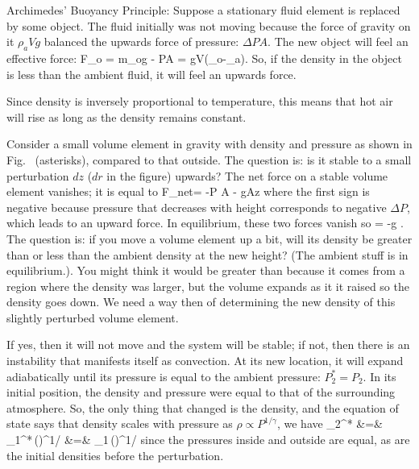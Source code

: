 \documentclass[11pt]{book}
\begin{document}
\bei
\item Archimedes' Buoyancy Principle: Suppose a stationary fluid element is replaced by some object. The fluid initially was not moving because the force of gravity on it $\rho_aVg$ balanced the upwards force of pressure: $\Delta P A$. The new object will feel an effective force:
\be
F_{\rm o} = m_og - \Delta PA = gV\left(\rho_o-\rho_a\right).\ee
So, if the density in the object is less than the ambient fluid, it will feel an upwards force. 
\item Since density is inversely proportional to temperature, this means that hot air will rise as long as the density remains constant.
\item 
Consider a small volume element in gravity with density and pressure as shown in Fig.~ (asterisks), compared to that outside. The question is: is it stable to a small perturbation $dz$ ($dr$ in the figure) upwards? The net force on a stable volume element vanishes; it is equal to 
\be
\Delta F_{net}= -\Delta P A - g\rho A\Delta z
\ee
where the first sign is negative because pressure that decreases with height corresponds to negative $\Delta P$, which leads to an upward force. In equilibrium, these two forces vanish so
\be
{} = -g\rho
.\ee
The question is: if you move a volume element up a bit, will its density be greater than or less than the ambient density at the new height? (The ambient stuff is in equilibrium.). You might think it would be greater than because it comes from a region where the density was larger, but the volume expands as it it raised so the density goes down. We need a way then of determining the new density of this slightly perturbed volume element.
\eei


If yes, then it will not move and the system will be stable; if not, then there is an instability that manifests itself as convection. At its new location, it will expand adiabatically until its pressure is equal to the ambient pressure: $P_2^*=P_2$. In its initial position, the density and pressure were equal to that of the surrounding atmosphere. So, the only thing that changed is the density, and the equation of state says that density scales with pressure as $\rho\propto P^{1/\gamma}$, we have
\bea
\rho_2^* &=& \rho_1^*\,\left(\right)^{1/\gamma}
\vs
&=&
 \rho_1\,\left(\right)^{1/\gamma}\eea
 since the pressures inside and outside are equal, as are the initial densities before the perturbation.

\end{document}
